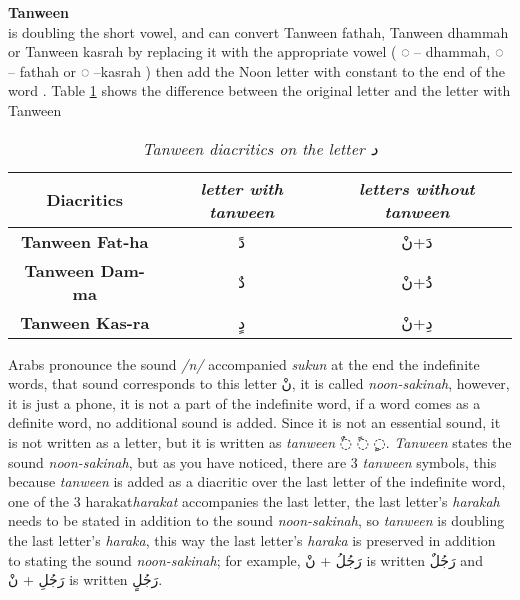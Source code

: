 \begin{definition}\label{def:tanween_definition}
  \textbf{Tanween} \hfill \\
  is doubling the short vowel, and can convert
Tanween fathah, Tanween dhammah or Tanween kasrah by
replacing it with the appropriate vowel ( ُ◌ – dhammah, َ◌ –
fathah or ِ◌ –kasrah ) then add the Noon letter with constant to the end of the word \cite{Alnagdawi2013}. Table \ref{tables:Tanween_dal}
shows the difference between the original letter and the letter with Tanween

\begin{table}[H]
	\centering
	\begin{tabular}{c c c}
		\toprule
		\textbf{\small{Diacritics}} & \small{\textit{letter with tanween }} & \small{\textit{letters without tanween}} \\
		\midrule
          
          \textbf{\small{Tanween Fat-ha}}  & \textarabic{دً} &  \textarabic{دَ+نْ}\\
          \textbf{\small{Tanween Dam-ma}}  & \textarabic{دٌ} &  \textarabic{دُ+نْ}\\
          \textbf{\small{Tanween Kas-ra}}  & \textarabic{دٍ} &  \textarabic{دِ+نْ}\\
          
	
		\bottomrule
	\end{tabular}
	\caption{\textit{Tanween diacritics on the letter  \textarabic{ د }}} \label{tables:Tanween_dal}
\end{table}


\end{definition}

 Arabs pronounce the sound \textit{/n/} accompanied \textit{sukun} at the end the indefinite words, that sound corresponds to this
letter \textarabic{نْ}, it is called \textit{noon-sakinah}, however, it is
just a phone, it is not a part of the indefinite word, if a word comes as a
definite word, no additional sound is added. Since it is not an essential sound,
it is not written as a letter, but it is written as  \textit{tanween}
\textarabic{◌ٌ ◌ً ◌ٍ}.
\textit{Tanween} states the sound \textit{noon-sakinah}, but as you have noticed,
there are 3 \textit{tanween} symbols, this because  \textit{tanween} is added as
a diacritic over the last letter of the indefinite word, one of the 3 harakat\textit{harakat} accompanies the last letter, the last letter's \textit{harakah}
needs to be stated in addition to the sound \textit{noon-sakinah}, so
\textit{tanween} is doubling the last letter's \textit{haraka}, this way the last
letter's \textit{haraka} is preserved in addition to stating the sound
\textit{noon-sakinah}; for example, \textarabic{رَجُلُ + نْ} is written
\textarabic{رَجُلٌ} and  \textarabic{رَجُلِ + نْ} is written \textarabic{رَجُلٍ}. 


